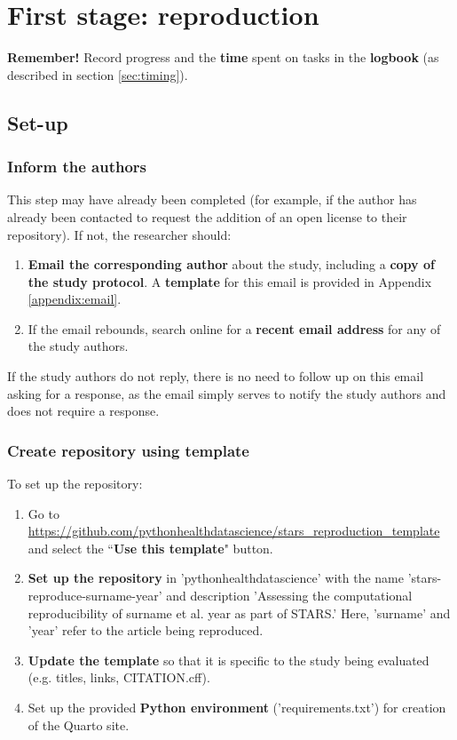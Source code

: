 \section{First stage: reproduction} \label{sec:reproduce}

\textbf{Remember!} Record progress and the \textbf{time} spent on tasks in the \textbf{logbook} (as described in section \ref{sec:timing}).

\vspace{0.5cm}
\subsection{Set-up}

\subsubsection{Inform the authors}

This step may have already been completed  (for example, if the author has already been contacted to request the addition of an open license to their repository). If not, the researcher should:
\begin{enumerate}
    \item \textbf{Email the corresponding author} about the study, including a \textbf{copy of the study protocol}. A \textbf{template} for this email is provided in Appendix \ref{appendix:email}.
    \item If the email rebounds, search online for a \textbf{recent email address} for any of the study authors.
\end{enumerate}

If the study authors do not reply, there is no need to follow up on this email asking for a response, as the email simply serves to notify the study authors and does not require a response.

\vspace{0.5cm}
\subsubsection{Create repository using template}

To set up the repository:

\begin{enumerate}
    \item Go to \url{https://github.com/pythonhealthdatascience/stars_reproduction_template} and select the ``\textbf{Use this template}" button.
    \item \textbf{Set up the repository} in 'pythonhealthdatascience' with the name 'stars-reproduce-surname-year' and description 'Assessing the computational reproducibility of surname et al. year as part of STARS.' Here, 'surname' and 'year' refer to the article being reproduced.
    \item \textbf{Update the template} so that it is specific to the study being evaluated (e.g. titles, links, CITATION.cff).
    \item Set up the provided \textbf{Python environment} ('requirements.txt') for creation of the Quarto site.
\end{enumerate}

